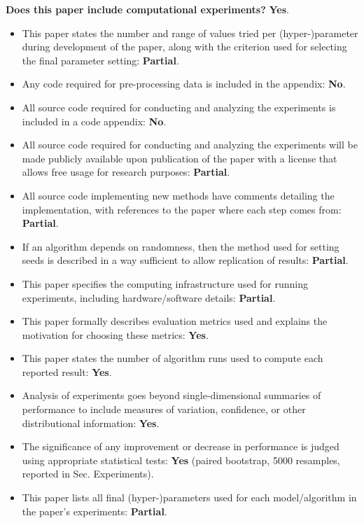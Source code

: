 ﻿\documentclass[letterpaper]{article}
\begin{document}
\noindent\textbf{Does this paper include computational experiments?} \textbf{Yes}.
\begin{itemize}
\item This paper states the number and range of values tried per (hyper-)parameter during development of the paper, along with the criterion used for selecting the final parameter setting: \textbf{Partial}.
\item Any code required for pre-processing data is included in the appendix: \textbf{No}.
\item All source code required for conducting and analyzing the experiments is included in a code appendix: \textbf{No}.
\item All source code required for conducting and analyzing the experiments will be made publicly available upon publication of the paper with a license that allows free usage for research purposes: \textbf{Partial}.
\item All source code implementing new methods have comments detailing the implementation, with references to the paper where each step comes from: \textbf{Partial}.
\item If an algorithm depends on randomness, then the method used for setting seeds is described in a way sufficient to allow replication of results: \textbf{Partial}.
\item This paper specifies the computing infrastructure used for running experiments, including hardware/software details: \textbf{Partial}.
\item This paper formally describes evaluation metrics used and explains the motivation for choosing these metrics: \textbf{Yes}.
\item This paper states the number of algorithm runs used to compute each reported result: \textbf{Yes}.
\item Analysis of experiments goes beyond single-dimensional summaries of performance to include measures of variation, confidence, or other distributional information: \textbf{Yes}.
\item The significance of any improvement or decrease in performance is judged using appropriate statistical tests: \textbf{Yes} (paired bootstrap, 5000 resamples, reported in Sec. Experiments).
\item This paper lists all final (hyper-)parameters used for each model/algorithm in the paper's experiments: \textbf{Partial}.
\end{itemize}
\end{document}
